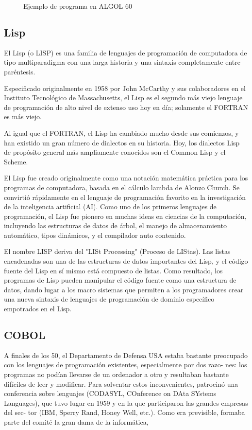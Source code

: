 \documentclass[twoside,twocolumn]{article}
\begin{document}
\begin{figure}[h]
\label{Fig1}
\caption[al.png]{Ejemplo de programa en ALGOL 60 }
\end{figure}

\subsection{Lisp}

El Lisp (o LISP) es una familia de lenguajes de programación de computadora de tipo multiparadigma con una larga historia y una sintaxis completamente entre paréntesis.

Especificado originalmente en 1958 por John McCarthy y sus colaboradores en el Instituto Tecnológico de Massachusetts, el Lisp es el segundo más viejo lenguaje de programación de alto nivel de extenso uso hoy en día; solamente el FORTRAN es más viejo.

Al igual que el FORTRAN, el Lisp ha cambiado mucho desde sus comienzos, y han existido un gran número de dialectos en su historia. Hoy, los dialectos Lisp de propósito general más ampliamente conocidos son el Common Lisp y el Scheme.

El Lisp fue creado originalmente como una notación matemática práctica para los programas de computadora, basada en el cálculo lambda de Alonzo Church. Se convirtió rápidamente en el lenguaje de programación favorito en la investigación de la inteligencia artificial (AI). Como uno de los primeros lenguajes de programación, el Lisp fue pionero en muchas ideas en ciencias de la computación, incluyendo las estructuras de datos de árbol, el manejo de almacenamiento automático, tipos dinámicos, y el compilador auto contenido.

El nombre LISP deriva del "LISt Processing" (Proceso de LIStas). Las listas encadenadas son una de las estructuras de datos importantes del Lisp, y el código fuente del Lisp en sí mismo está compuesto de listas. Como resultado, los programas de Lisp pueden manipular el código fuente como una estructura de datos, dando lugar a los macro sistemas que permiten a los programadores crear una nueva sintaxis de lenguajes de programación de dominio específico empotrados en el Lisp.

\subsection{COBOL}

A finales de los 50, el Departamento de Defensa
USA estaba bastante preocupado con los lenguajes de
programación existentes, especialmente por dos razo-
nes: los programas no podían llevarse de un ordenador
a otro y resultaban bastante difíciles de leer y modificar.
Para solventar estos inconvenientes, patrocinó una
conferencia sobre lenguajes (CODASYL, COnference
on DAta SYstems Languages), que tuvo lugar en 1959
y en la que participaron las grandes empresas del sec-
tor (IBM, Sperry Rand, Honey Well, etc.). Como era
previsible, formaba parte del comité la gran dama de la
informática,
\end{document}
